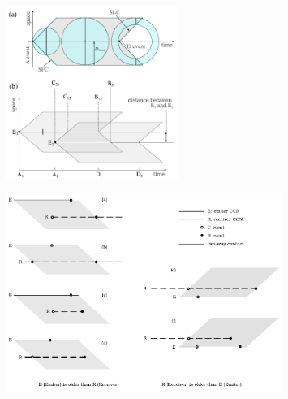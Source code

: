 \begin{figure}[!t]
   \centering
   \includegraphics[width=0.5\textwidth]{F_scheme.pdf}
    \label{F_scheme}
\end{figure}
 
\begin{figure}
   \centering
   \includegraphics[width=0.8\textwidth]{F_messages.pdf}
    \label{F_messages}
\end{figure}  
 

       


